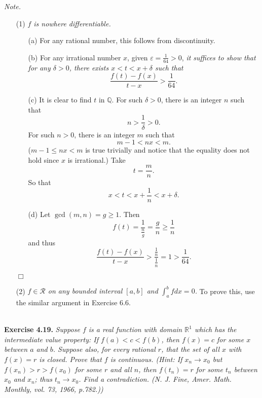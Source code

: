 \documentclass{article}
\begin{document}
\emph{Note.}
\begin{enumerate}
\item[(1)]
\emph{$f$ is nowhere differentiable.}
  \begin{enumerate}
  \item[(a)]
  For any rational number, this follows from discontinuity.

  \item[(b)]
  For any irrational number $x$, given $\varepsilon = \frac{1}{64} > 0$,
  \emph{it suffices to show that for any $\delta > 0$, there exists $x < t < x + \delta$ such that
  \[
    \frac{f(t)-f(x)}{t-x} > \frac{1}{64}.
  \]}

  \item[(c)]
  It is clear to find $t$ in $\mathbb{Q}$.
  For such $\delta > 0$, there is an integer $n$ such that
  \[
    n > \frac{1}{\delta} > 0.
  \]
  For such $n > 0$, there is an integer $m$ such that
  \[
    m-1 < nx < m.
  \]
  ($m-1 \leq nx < m$ is true trivially and notice that the equality does not hold
  since $x$ is irrational.)
  Take
  \[
    t = \frac{m}{n}.
  \]
  So that
  \[
    x < t < x + \frac{1}{n} < x + \delta.
  \]

  \item[(d)]
  Let $\gcd(m,n) = g \geq 1$.
  Then
  \[
    f(t) = \frac{1}{\frac{n}{g}} = \frac{g}{n} \geq \frac{1}{n}
  \]
  and thus
  \[
    \frac{f(t)-f(x)}{t-x} > \frac{\frac{1}{n}}{\frac{1}{n}} = 1 > \frac{1}{64}.
  \]
  \end{enumerate}
  $\Box$ \\

\item[(2)]
\emph{$f \in \mathscr{R}$ on any bounded interval $[a,b]$ and $\int_{a}^{b} f dx = 0$.}
To prove this, use the similar argument in Exercise 6.6. \\\\
\end{enumerate}






\textbf{Exercise 4.19.}
\emph{Suppose $f$ is a real function with domain $\mathbb{R}^1$
which has the intermediate value property:
If $f(a) < c < f(b)$, then $f(x)=c$ for some $x$ between $a$ and $b$.
Suppose also, for every rational $r$,
that the set of all $x$ with $f(x)=r$ is closed.
Prove that $f$ is continuous.
(Hint: If $x_n \to x_0$ but $f(x_n) > r > f(x_0)$ for some $r$ and all $n$,
then $f(t_n) = r$ for some $t_n$ between $x_0$ and $x_n$;
thus $t_n \to x_0$.
Find a contradiction.
(N. J. Fine, Amer. Math. Monthly, vol. 73, 1966, p.782.))} \\
\end{document}
